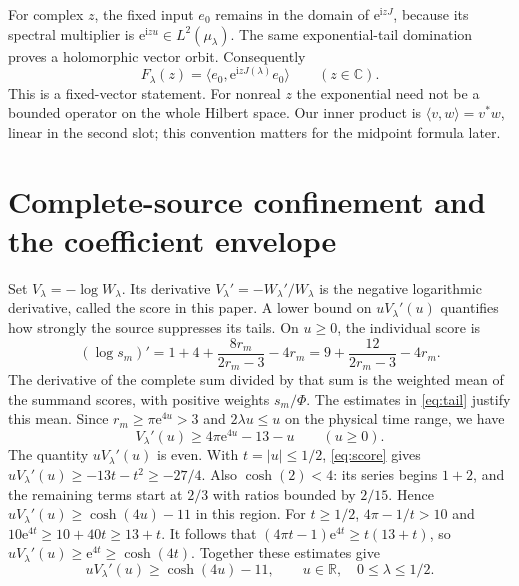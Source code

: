 \documentclass[11pt]{article}
\numberwithin{equation}{section}
\newcommand{\e}{\mathrm e}
\newcommand{\ii}{\mathrm i}
\newcommand{\R}{\mathbb R}
\begin{document}
For complex \(z\), the fixed input \(e_0\) remains in the domain
of \(\e^{\ii zJ}\), because its spectral multiplier is
\(\e^{\ii zu}\in L^2(\mu_\lambda)\).
The same exponential-tail domination proves a holomorphic vector
orbit. Consequently
\begin{equation}
 F_\lambda(z)=\langle e_0,\e^{\ii zJ(\lambda)}e_0\rangle
                 \qquad(z\in\mathbb C).
 \label{eq:full-readout}
\end{equation}
This is a fixed-vector statement. For nonreal \(z\) the exponential
need not be a bounded operator on the whole Hilbert space.
Our inner product is \(\langle v,w\rangle=v^*w\), linear in the
second slot; this convention matters for the midpoint formula later.

\section{Complete-source confinement and the coefficient envelope}
\label{sec:confinement}

Set \(V_\lambda=-\log W_\lambda\).
Its derivative \(V_\lambda'=-W_\lambda'/W_\lambda\) is the negative
logarithmic derivative, called the score in this paper. A lower
bound on \(uV_\lambda'(u)\) quantifies how strongly the source
suppresses its tails.
On \(u\ge0\), the individual score is
\[
 (\log s_m)'=1+4+\frac{8r_m}{2r_m-3}-4r_m
            =9+\frac{12}{2r_m-3}-4r_m .
\]
The derivative of the complete sum divided by that sum is the
weighted mean of the summand scores, with positive weights
\(s_m/\Phi\). The estimates in \eqref{eq:tail} justify this mean.
Since \(r_m\ge\pi\e^{4u}>3\) and \(2\lambda u\le u\) on the
physical time range, we have
\begin{equation}
 V_\lambda'(u)\ge 4\pi\e^{4u}-13-u \qquad(u\ge0).
 \label{eq:score}
\end{equation}
The quantity \(uV_\lambda'(u)\) is even. With \(t=|u|\le1/2\),
\eqref{eq:score} gives \(uV_\lambda'(u)\ge-13t-t^2\ge-27/4\).
Also \(\cosh(2)<4\): its series begins \(1+2\), and the remaining
terms start at \(2/3\) with ratios bounded by \(2/15\).
Hence \(uV_\lambda'(u)\ge\cosh(4u)-11\) in this region.
For \(t\ge1/2\), \(4\pi-1/t>10\) and
\(10\e^{4t}\ge10+40t\ge13+t\). It follows that
\((4\pi t-1)\e^{4t}\ge t(13+t)\), so
\(uV_\lambda'(u)\ge\e^{4t}\ge\cosh(4t)\).
Together these estimates give
\begin{equation}
 uV_\lambda'(u)\ge\cosh(4u)-11,\qquad
 u\in\R,\quad 0\le\lambda\le1/2 .
 \label{eq:confinement}
\end{equation}
\end{document}

